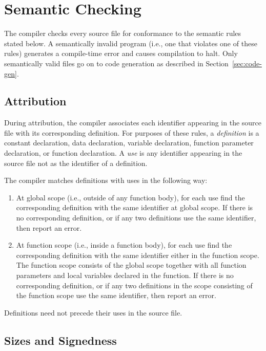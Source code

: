 \documentclass[10pt]{article}
\begin{document}
\section{Semantic Checking}
\label{sec:semantics}

The compiler checks every source file for conformance to the semantic
rules stated below.  A semantically invalid program (i.e., one that
violates one of these rules) generates a compile-time error and causes
compilation to halt.  Only semantically valid files go on to code
generation as described in Section~\ref{sec:code-gen}.

\subsection{Attribution}
\label{sec:semantics:attr}

During attribution, the compiler associates each identifier appearing
in the source file with its corresponding definition.  For purposes of
these rules, a \emph{definition} is a constant declaration, data
declaration, variable declaration, function parameter declaration, or
function declaration.  A \emph{use} is any identifier appearing in the
source file not as the identifier of a definition.

The compiler matches definitions with uses in the following way:
%
\begin{enumerate}
%
\item At global scope (i.e., outside of any function body), for each
  use find the corresponding definition with the same identifier at
  global scope.  If there is no corresponding definition, or if any
  two definitions use the same identifier, then  report an error.
%
\item At function scope (i.e., inside a function body), for each use
  find the corresponding definition with the same identifier either in
  the function scope.  The function scope consists of the global scope
  together with all function parameters and local variables declared
  in the function.  If there is no corresponding definition, or if any
  two definitions in the scope consisting of the function scope use
  the same identifier, then report an error.
%
\end{enumerate}
%
Definitions need not precede their uses in the source file.

\subsection{Sizes and Signedness}
\label{sec:semantics:size}
\end{document}
